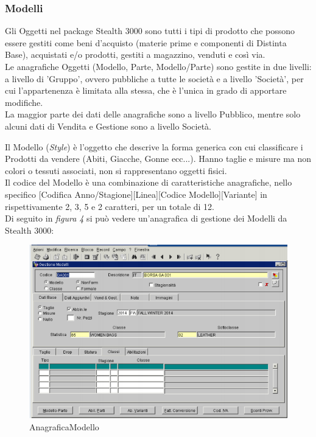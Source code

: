 \subsubsection{Modelli}
Gli Oggetti nel package Stealth 3000 sono tutti i tipi di prodotto che possono essere gestiti come beni d’acquisto (materie prime e componenti di Distinta Base), acquistati e/o prodotti, gestiti a magazzino, venduti e così via. \\
Le anagrafiche Oggetti (Modello, Parte, Modello/Parte) sono gestite in due livelli: a livello di 'Gruppo', ovvero pubbliche a tutte le società e a livello 'Società', per cui l'appartenenza è limitata alla stessa, che è l'unica in grado di apportare modifiche.\\
 La maggior parte dei dati delle anagrafiche sono a livello Pubblico, mentre solo alcuni dati di Vendita e Gestione sono a livello Società.

Il Modello (\textit{Style}) è l’oggetto che descrive la forma generica con cui classificare i Prodotti da vendere (Abiti, Giacche, Gonne ecc...). Hanno taglie e misure ma non colori o tessuti associati, non si rappresentano oggetti fisici.\\ 
Il codice del Modello è una combinazione di caratteristiche anagrafiche, nello specifico [Codifica Anno/Stagione][Linea][Codice Modello][Variante] in rispettivamente 2, 3, 5 e 2 caratteri, per un totale di 12.\\
Di seguito in \textit{figura 4} si può vedere un'anagrafica di gestione dei Modelli da Stealth 3000:
\begin{figure}[!h]
\thispagestyle{empty}
\centering
\includegraphics[scale=0.90]{img/Modello.png}
\caption{AnagraficaModello}
\end{figure}
\newpage

